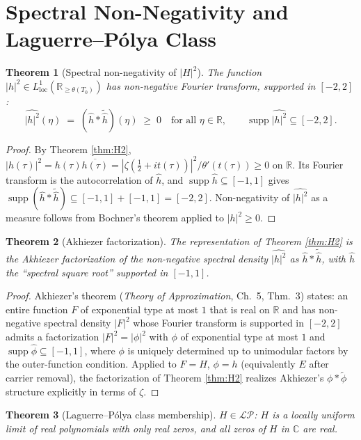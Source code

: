 \documentclass[11pt]{article}
\newtheorem{theorem}{Theorem}
\theoremstyle{definition}
\DeclareMathOperator{\supp}{supp}
\begin{document}
\section{Spectral Non-Negativity and Laguerre--Pólya Class}

\begin{theorem}[Spectral non-negativity of $|H|^2$]\label{thm:specpos}
The function $|h|^2 \in L^1_{\mathrm{loc}}(\mathbb{R}_{\ge\theta(T_0)})$ has non-negative Fourier transform, supported in $[-2, 2]$:
\[
\widehat{|h|^2}(\eta) \;=\; (\hat h * \widetilde{\hat h})(\eta) \;\ge\; 0 \quad \text{for all } \eta \in \mathbb{R},\qquad \supp\widehat{|h|^2} \subseteq [-2, 2].
\]
\end{theorem}

\begin{proof}
By Theorem \ref{thm:H2}, $|h(\tau)|^2 = h(\tau)\overline{h(\tau)} = |\zeta(\tfrac12+it(\tau))|^2/\theta'(t(\tau)) \ge 0$ on $\mathbb{R}$. Its Fourier transform is the autocorrelation of $\hat h$, and $\supp\hat h \subseteq [-1, 1]$ gives $\supp(\hat h * \widetilde{\hat h}) \subseteq [-1,1] + [-1,1] = [-2, 2]$. Non-negativity of $\widehat{|h|^2}$ as a measure follows from Bochner's theorem applied to $|h|^2 \ge 0$.
\end{proof}

\begin{theorem}[Akhiezer factorization]\label{thm:akhiezer}
The representation of Theorem \ref{thm:H2} is the Akhiezer factorization of the non-negative spectral density $\widehat{|h|^2}$ as $\hat h * \widetilde{\hat h}$, with $\hat h$ the ``spectral square root'' supported in $[-1, 1]$.
\end{theorem}

\begin{proof}
Akhiezer's theorem (\emph{Theory of Approximation}, Ch.~5, Thm.~3) states: an entire function $F$ of exponential type at most $1$ that is real on $\mathbb{R}$ and has non-negative spectral density $|F|^2$ whose Fourier transform is supported in $[-2, 2]$ admits a factorization $|F|^2 = |\phi|^2$ with $\phi$ of exponential type at most $1$ and $\supp\hat\phi \subseteq [-1, 1]$, where $\phi$ is uniquely determined up to unimodular factors by the outer-function condition. Applied to $F = H$, $\phi = h$ (equivalently $E$ after carrier removal), the factorization of Theorem \ref{thm:H2} realizes Akhiezer's $\phi * \tilde\phi$ structure explicitly in terms of $\zeta$.
\end{proof}

\begin{theorem}[Laguerre--P\'olya class membership]\label{thm:LP}
$H \in \mathcal{LP}$: $H$ is a locally uniform limit of real polynomials with only real zeros, and all zeros of $H$ in $\mathbb{C}$ are real.
\end{theorem}
\end{document}
